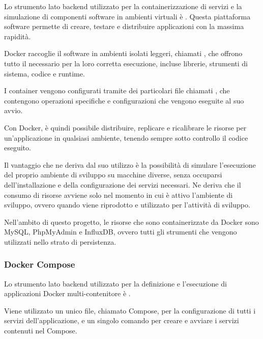\documentclass[../../../manuale-manutentore.tex]{subfiles}
\begin{document}
Lo strumento lato backend utilizzato per la containerizzazione di servizi e la simulazione di componenti software in ambienti virtuali è . Questa piattaforma software permette di creare, testare e distribuire applicazioni con la massima rapidità.

Docker raccoglie il software in ambienti isolati leggeri, chiamati , che offrono tutto il necessario per la loro corretta esecuzione, incluse librerie, strumenti di sistema, codice e runtime.

I container vengono configurati tramite dei particolari file chiamati , che contengono operazioni specifiche e configurazioni che vengono eseguite al suo avvio.

Con Docker, è quindi possibile distribuire, replicare e ricalibrare le risorse per un'applicazione in qualsiasi ambiente, tenendo sempre sotto controllo il codice eseguito.

Il vantaggio che ne deriva dal suo utilizzo è la possibilità di simulare l'esecuzione del proprio ambiente di sviluppo su macchine diverse, senza occuparsi dell'installazione e della configurazione dei servizi necessari. Ne deriva che il consumo di risorse avviene solo nel momento in cui è attivo l'ambiente di sviluppo, ovvero quando viene riprodotto e utilizzato per l'attività di sviluppo.

Nell'ambito di questo progetto, le risorse che sono containerizzate da Docker sono MySQL, PhpMyAdmin e InfluxDB, ovvero tutti gli strumenti che vengono utilizzati nello strato di persistenza.

\subsubsection{Docker Compose}%
\label{subs:docker_compose}

Lo strumento lato backend utilizzato per la definizione e l'esecuzione di applicazioni Docker multi-contenitore è .

Viene utilizzato un unico file, chiamato Compose, per la configurazione di tutti i servizi dell'applicazione, e un singolo comando per creare e avviare i servizi contenuti nel Compose.

\end{document}
